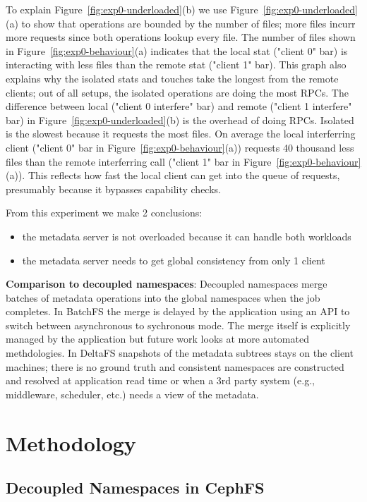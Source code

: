 \documentclass[preprint]{sigplanconf-eurosys}
\begin{document}
To explain Figure~\ref{fig:exp0-underloaded}(b) we use
Figure~\ref{fig:exp0-underloaded}(a) to show that operations are bounded by the
number of files; more files incurr more requests since both operations lookup
every file. The number of files shown in Figure~\ref{fig:exp0-behaviour}(a)
indicates that the local stat ("client 0" bar) is interacting with less files
than the remote stat ("client 1" bar). This graph also explains why the
isolated stats and touches take the longest from the remote clients; out of all
setups, the isolated operations are doing the most RPCs.  The difference
between local ("client 0 interfere" bar) and remote ("client 1 interfere" bar)
in Figure~\ref{fig:exp0-underloaded}(b) is the overhead of doing RPCs.
Isolated is the slowest because it requests the most files. On average the
local interferring client ("client 0" bar in
Figure~\ref{fig:exp0-behaviour}(a)) requests 40 thousand less files than the
remote interferring call ("client 1" bar in
Figure~\ref{fig:exp0-behaviour}(a)). This reflects how fast the local client
can get into the queue of requests, presumably because it bypasses capability
checks.

From this experiment we make 2 conclusions:
\begin{itemize}
  \item the metadata server is not overloaded because it can handle both workloads
  \item the metadata server needs to get global consistency from only 1 client
\end{itemize}

\textbf{Comparison to decoupled namespaces}: Decoupled namespaces merge batches
of metadata operations into the global namespaces when the job completes.  In
BatchFS the merge is delayed by the application using an API to switch between
asynchronous to sychronous mode. The merge itself is explicitly managed by the
application but future work looks at more automated methdologies. In DeltaFS
snapshots of the metadata subtrees stays on the client machines; there is no
ground truth and consistent namespaces are constructed and resolved at
application read time or when a 3rd party system (e.g., middleware, scheduler,
etc.) needs a view of the metadata.

\section{Methodology}

\subsection{Decoupled Namespaces in CephFS}
\end{document}
